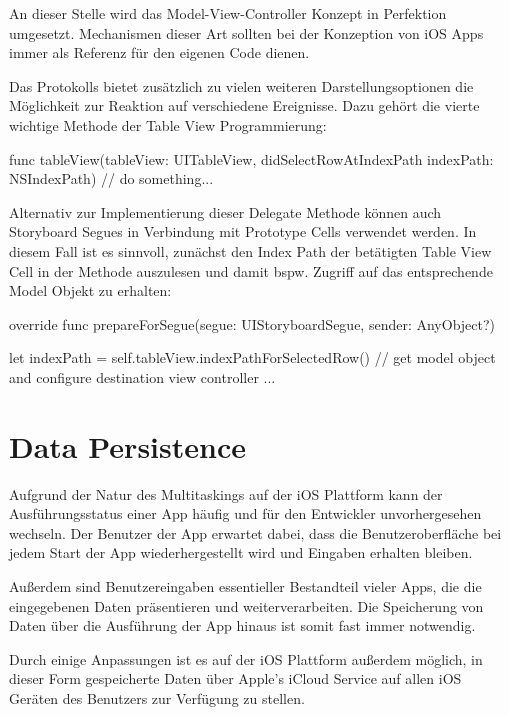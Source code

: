 \documentclass[parskip=half, final]{scrreprt}
\begin{document}
An dieser Stelle wird das Model-View-Controller Konzept  in Perfektion umgesetzt. Mechanismen dieser Art sollten bei der Konzeption von iOS Apps immer als Referenz für den eigenen Code dienen.

Das  Protokolls bietet zusätzlich zu vielen weiteren Darstellungsoptionen die Möglichkeit zur Reaktion auf verschiedene Ereignisse. Dazu gehört die vierte wichtige Methode der Table View Programmierung:

\begin{swiftcode}
func tableView(tableView: UITableView, didSelectRowAtIndexPath indexPath: NSIndexPath) {
    // do something...
}
\end{swiftcode}

Alternativ zur Implementierung dieser Delegate Methode können auch Storyboard Segues in Verbindung mit Prototype Cells verwendet werden. In diesem Fall ist es sinnvoll, zunächst den Index Path der betätigten Table View Cell in der  Methode auszulesen und damit bspw. Zugriff auf das entsprechende Model Objekt zu erhalten:

\begin{swiftcode}
override func prepareForSegue(segue: UIStoryboardSegue, sender: AnyObject?) {
    let indexPath = self.tableView.indexPathForSelectedRow()
    // get model object and configure destination view controller ...

}
\end{swiftcode}



\section{Data Persistence}

Aufgrund der Natur des Multitaskings auf der iOS Plattform kann der Ausführungsstatus einer App  häufig und für den Entwickler unvorhergesehen wechseln. Der Benutzer der App erwartet dabei, dass die Benutzeroberfläche bei jedem Start der App wiederhergestellt wird und Eingaben erhalten bleiben.

Außerdem sind Benutzereingaben essentieller Bestandteil vieler Apps, die die eingegebenen Daten präsentieren und weiterverarbeiten. Die Speicherung von Daten über die Ausführung der App hinaus ist somit fast immer notwendig.

Durch einige Anpassungen ist es auf der iOS Plattform außerdem möglich, in dieser Form gespeicherte Daten über Apple's iCloud Service auf allen iOS Geräten des Benutzers zur Verfügung zu stellen.
\end{document}
